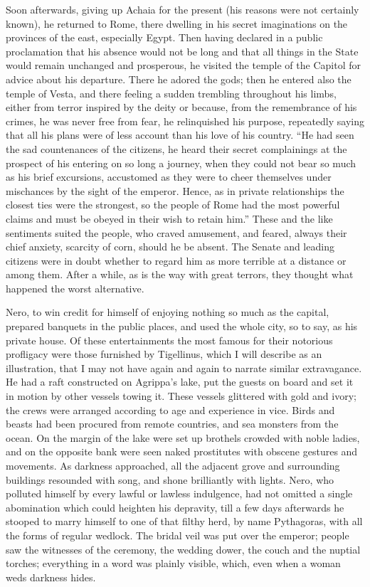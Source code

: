 Soon afterwards, giving up Achaia for the present (his reasons were not certainly known), he returned to Rome, there dwelling in his secret imaginations on the provinces of the east, especially Egypt. Then having declared in a public proclamation that his absence would not be long and that all things in the State would remain unchanged and prosperous, he visited the temple of the Capitol for advice about his departure. There he adored the gods; then he entered also the temple of Vesta, and there feeling a sudden trembling throughout his limbs, either from terror inspired by the deity or because, from the remembrance of his crimes, he was never free from fear, he relinquished his purpose, repeatedly saying that all his plans were of less account than his love of his country. ``He had seen the sad countenances of the citizens, he heard their secret complainings at the prospect of his entering on so long a journey, when they could not bear so much as his brief excursions, accustomed as they were to cheer themselves under mischances by the sight of the emperor. Hence, as in private relationships the closest ties were the strongest, so the people of Rome had the most powerful claims and must be obeyed in their wish to retain him.'' These and the like sentiments suited the people, who craved amusement, and feared, always their chief anxiety, scarcity of corn, should he be absent. The Senate and leading citizens were in doubt whether to regard him as more terrible at a distance or among them. After a while, as is the way with great terrors, they thought what happened the worst alternative.


Nero, to win credit for himself of enjoying nothing so much as the capital, prepared banquets in the public places, and used the whole city, so to say, as his private house. Of these entertainments the most famous for their notorious profligacy were those furnished by Tigellinus, which I will describe as an illustration, that I may not have again and again to narrate similar extravagance. He had a raft constructed on Agrippa's lake, put the guests on board and set it in motion by other vessels towing it. These vessels glittered with gold and ivory; the crews were arranged according to age and experience in vice. Birds and beasts had been procured from remote countries, and sea monsters from the ocean. On the margin of the lake were set up brothels crowded with noble ladies, and on the opposite bank were seen naked prostitutes with obscene gestures and movements. As darkness approached, all the adjacent grove and surrounding buildings resounded with song, and shone brilliantly with lights. Nero, who polluted himself by every lawful or lawless indulgence, had not omitted a single abomination which could heighten his depravity, till a few days afterwards he stooped to marry himself to one of that filthy herd, by name Pythagoras, with all the forms of regular wedlock. The bridal veil was put over the emperor; people saw the witnesses of the ceremony, the wedding dower, the couch and the nuptial torches; everything in a word was plainly visible, which, even when a woman weds darkness hides.

